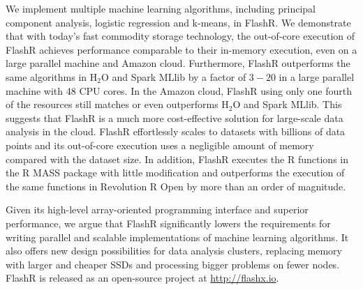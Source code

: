 
We implement multiple machine learning algorithms, including principal component
analysis, logistic regression and k-means, in FlashR. We demonstrate that
with today's fast commodity storage technology, the out-of-core execution of
FlashR achieves performance comparable to their in-memory execution, even
on a large parallel machine and Amazon cloud. Furthermore, FlashR outperforms
the same algorithms in H$_2$O \cite{h2o} and Spark MLlib \cite{spark} by a factor
of $3-20$ in a large parallel machine with 48 CPU cores. In the Amazon cloud,
FlashR using only one fourth of the resources still matches or even outperforms
H$_2$O and Spark MLlib. This suggests that FlashR is a much
more cost-effective solution for large-scale data analysis in the cloud.
FlashR effortlessly scales to datasets with billions
of data points and its out-of-core execution uses a negligible amount of memory
compared with the dataset size. In addition, FlashR executes the R functions
in the R MASS \cite{mass} package with little modification and outperforms
the execution of the same functions in Revolution R Open \cite{rro} by more
than an order of magnitude.

Given its high-level array-oriented programming interface and superior performance,
we argue that FlashR significantly lowers the requirements for writing
parallel and scalable implementations of machine learning algorithms. It also
offers new design possibilities for data analysis clusters, replacing memory
with larger and cheaper SSDs and processing bigger problems on fewer nodes.
FlashR is released as an open-source project at \href{http://flashx.io}{http://flashx.io}.


